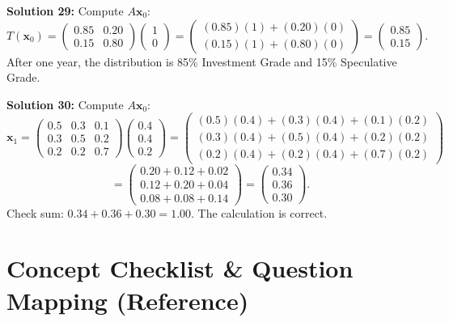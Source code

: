 \documentclass{article}
\begin{document}
\textbf{Solution 29:}
Compute $A\mathbf{x}_0$:
$$T(\mathbf{x}_0) = \begin{pmatrix} 0.85 & 0.20 \\ 0.15 & 0.80 \end{pmatrix} \begin{pmatrix} 1 \\ 0 \end{pmatrix} = \begin{pmatrix} (0.85)(1) + (0.20)(0) \\ (0.15)(1) + (0.80)(0) \end{pmatrix} = \begin{pmatrix} 0.85 \\ 0.15 \end{pmatrix}.$$
After one year, the distribution is 85\% Investment Grade and 15\% Speculative Grade.

\textbf{Solution 30:}
Compute $A\mathbf{x}_0$:
$$\mathbf{x}_1 = \begin{pmatrix} 0.5 & 0.3 & 0.1 \\ 0.3 & 0.5 & 0.2 \\ 0.2 & 0.2 & 0.7 \end{pmatrix} \begin{pmatrix} 0.4 \\ 0.4 \\ 0.2 \end{pmatrix} = \begin{pmatrix} (0.5)(0.4) + (0.3)(0.4) + (0.1)(0.2) \\ (0.3)(0.4) + (0.5)(0.4) + (0.2)(0.2) \\ (0.2)(0.4) + (0.2)(0.4) + (0.7)(0.2) \end{pmatrix}$$
$$= \begin{pmatrix} 0.20 + 0.12 + 0.02 \\ 0.12 + 0.20 + 0.04 \\ 0.08 + 0.08 + 0.14 \end{pmatrix} = \begin{pmatrix} 0.34 \\ 0.36 \\ 0.30 \end{pmatrix}.$$
Check sum: $0.34 + 0.36 + 0.30 = 1.00$. The calculation is correct.

\newpage
\section{Concept Checklist \& Question Mapping (Reference)}
\end{document}
